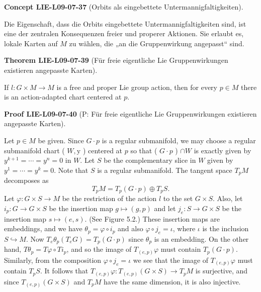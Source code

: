 \documentclass[10pt, letterpaper]{article}
\newcommand{\CustomHeading}[3]{%
  \par\medskip\noindent%
  \textbf{#1 #2} \textnormal{(#3)}.\enskip%
}
\newenvironment{THEO}[2]{\CustomHeading{Theorem}{#1}{#2}}{}
\newenvironment{CONC}[2]{\CustomHeading{Concept}{#1}{#2}}{}
\newenvironment{PROOF}[2]{\CustomHeading{Proof}{#1}{#2}}{}
\begin{document}
\begin{CONC}{LIE-L09-07-37}{Orbits als eingebettete Untermannigfaltigkeiten}
Die Eigenschaft, dass die Orbits eingebettete Untermannigfaltigkeiten sind,
ist eine der zentralen Konsequenzen freier und properer Aktionen.
Sie erlaubt es, lokale Karten auf $M$ zu wählen, die „an die Gruppenwirkung angepasst“ sind.
\end{CONC}

\begin{THEO}{LIE-L09-07-39}{Für freie eigentliche Lie Gruppenwirkungen existieren angepasste Karten}
If $l: G \times M \rightarrow M$ is a free and proper Lie group action, then for every $p \in M$ there is an action-adapted chart centered at $p$.
\end{THEO}

\begin{PROOF}{LIE-L09-07-40}{P: Für freie eigentliche Lie Gruppenwirkungen existieren angepasste Karten}
Let $p \in M$ be given. Since $G \cdot p$ is a regular submanifold, we may choose a regular submanifold chart ( $W, \mathrm{y}$ ) centered at $p$ so that ( $G \cdot p$ ) $\cap W$ is exactly given by $y^{k+1}=\cdots=y^{n}=0$ in $W$. Let $S$ be the complementary slice in $W$ given by $y^{1}=\cdots=y^{k}=0$. Note that $S$ is a regular submanifold. The tangent space $T_{p} M$ decomposes as
$$
T_{p} M=T_{p}(G \cdot p) \oplus T_{p} S .
$$
Let $\varphi: G \times S \rightarrow M$ be the restriction of the action $l$ to the set $G \times S$. Also, let $i_{p}: G \rightarrow G \times S$ be the insertion map $g \mapsto(g, p)$ and let $j_{e}: S \rightarrow G \times S$ be the insertion map $s \mapsto(e, s)$. (See Figure 5.2.) These insertion maps are embeddings, and we have $\theta_{p}=\varphi \circ i_{p}$ and also $\varphi \circ j_{e}=\iota$, where $\iota$ is the inclusion $S \hookrightarrow M$. Now $T_{e} \theta_{p}\left(T_{e} G\right)=T_{p}(G \cdot p)$ since $\theta_{p}$ is an embedding. On the other hand, $T \theta_{p}=T \varphi \circ T i_{p}$, and so the image of $T_{(e, p)} \varphi$ must contain $T_{p}(G \cdot p)$. Similarly, from the composition $\varphi \circ j_{e}=\iota$ we see that the image of $T_{(e, p)} \varphi$ must contain $T_{p} S$. It follows that $T_{(e, p)} \varphi: T_{(e, p)}(G \times S) \rightarrow T_{p} M$ is surjective, and since $T_{(e, p)}(G \times S)$ and $T_{p} M$ have the same dimension, it is also injective.


\end{PROOF}
\end{document}
